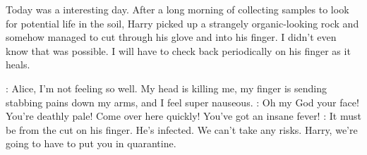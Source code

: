\documentclass[main.tex]{subfiles}
\begin{document}
	Today was a interesting day.  After a long morning of collecting samples to look for
	potential life in the soil, Harry picked up a strangely organic-looking rock and somehow managed to cut
	through his glove and into his finger.  I didn't even know that was possible.  I will have to check back periodically on his
	finger as it heals.  
	\begin{drama}
		
		
		\jonesspeaks:		Alice, I'm not feeling so well.  My head is killing me, my finger is sending stabbing pains
		down my arms, and I feel super nauseous.
		\lewisspeaks:		Oh my God your face!  You're deathly pale!  Come over here quickly!  You've got an insane
		fever!  
		\ramseyspeaks:		It must be from the cut on his finger.  He's infected.  We can't take any risks.  Harry,
		we're going to have to put you in quarantine.  
		
	\end{drama}
	
\end{document}
